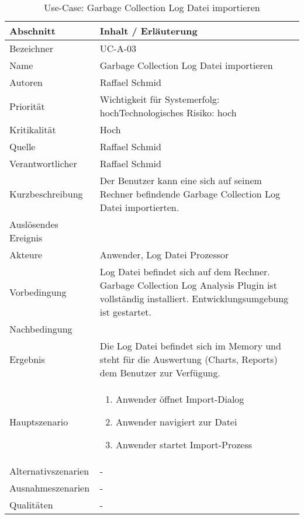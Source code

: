 \begin{longtable}{|p{4cm}|p{10.5cm}|}
\caption{Use-Case: Garbage Collection Log Datei importieren}\\\hline
   \textbf{Abschnitt} & \textbf{Inhalt / Erläuterung} \\\hline
   Bezeichner & UC-A-03\\\hline
   Name & Garbage Collection Log Datei importieren\\\hline
   Autoren & Raffael Schmid\\\hline
   Priorität & Wichtigkeit für Systemerfolg: hoch\newline Technologisches Risiko: hoch\\\hline
   Kritikalität & Hoch\\\hline
   Quelle & Raffael Schmid\\\hline
   Verantwortlicher & Raffael Schmid\\\hline
   Kurzbeschreibung & Der Benutzer kann eine sich auf seinem Rechner befindende Garbage Collection Log Datei importierten.\\\hline
   Auslösendes Ereignis & \\\hline
   Akteure & Anwender, Log Datei Prozessor\\\hline
   Vorbedingung & Log Datei befindet sich auf dem Rechner. Garbage Collection Log Analysis Plugin ist vollständig installiert. Entwicklungsumgebung ist gestartet.\\\hline
   Nachbedingung & \\\hline
   Ergebnis & Die Log Datei befindet sich im Memory und steht für die Auswertung (Charts, Reports) dem Benutzer zur Verfügung.\\\hline
   Hauptszenario & 
	\begin{enumerate}
		\item Anwender öffnet Import-Dialog
		\item Anwender navigiert zur Datei
		\item Anwender startet Import-Prozess
	\end{enumerate}
	\\\hline
   Alternativszenarien & -\\\hline
   Ausnahmeszenarien & -\\\hline
   Qualitäten & -\\\hline
\end{longtable}

